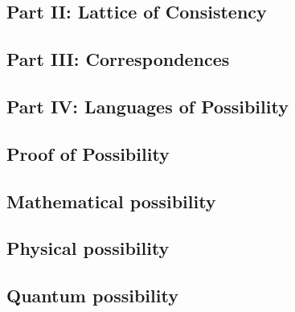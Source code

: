 \hypertarget{part-ii-lattice-of-consistency}{%
\subsection*{\texorpdfstring{Part II: Lattice of Consistency
}{Part II: Lattice of Consistency }}\label{part-ii-lattice-of-consistency}}

\hypertarget{part-iii-correspondences}{%
\subsection*{\texorpdfstring{Part III: Correspondences
}{Part III: Correspondences }}\label{part-iii-correspondences}}

\hypertarget{part-iv-languages-of-possibility}{%
\subsection*{\texorpdfstring{Part IV: Languages of Possibility
}{Part IV: Languages of Possibility }}\label{part-iv-languages-of-possibility}}

\hypertarget{proof-of-possibility}{%
\subsection*{\texorpdfstring{Proof of Possibility
}{Proof of Possibility }}\label{proof-of-possibility}}

\hypertarget{mathematical-possibility}{%
\subsection*{\texorpdfstring{Mathematical possibility
}{Mathematical possibility }}\label{mathematical-possibility}}

\hypertarget{physical-possibility}{%
\subsection*{\texorpdfstring{Physical possibility
}{Physical possibility }}\label{physical-possibility}}

\hypertarget{quantum-possibility}{%
\subsection*{\texorpdfstring{Quantum possibility
}{Quantum possibility }}\label{quantum-possibility}}

